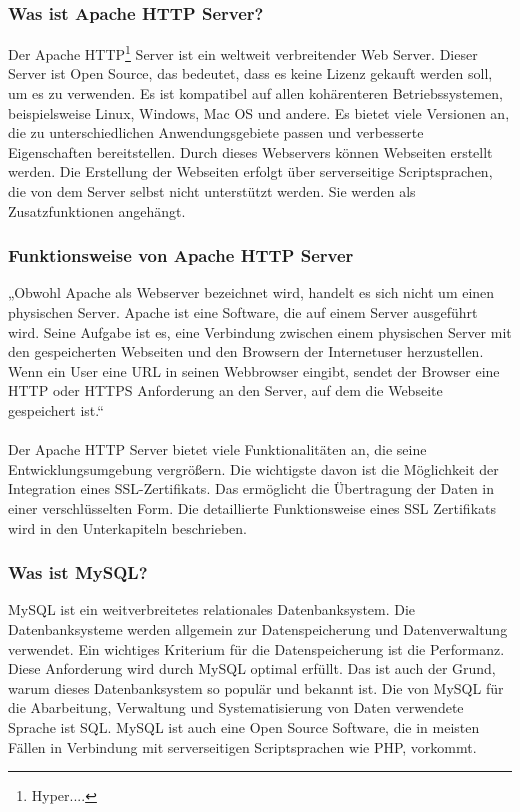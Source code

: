 \subsubsection{Was ist Apache HTTP Server?} 
Der Apache HTTP\footnote{Hyper....} Server ist ein weltweit verbreitender Web Server. Dieser Server ist Open Source, das bedeutet, dass es keine Lizenz gekauft werden soll, um es zu verwenden. Es ist kompatibel auf allen kohärenteren Betriebssystemen, beispielsweise Linux, Windows, Mac OS und andere. Es bietet viele Versionen an, die zu unterschiedlichen Anwendungsgebiete passen und verbesserte Eigenschaften bereitstellen. Durch dieses Webservers können Webseiten erstellt werden. Die Erstellung der Webseiten erfolgt über serverseitige Scriptsprachen, die von dem Server selbst nicht unterstützt werden. Sie werden als Zusatzfunktionen angehängt. 
\subsubsection{Funktionsweise von Apache HTTP Server} 
„Obwohl Apache als Webserver bezeichnet wird, handelt es sich nicht um einen physischen Server. Apache ist eine Software, die auf einem Server ausgeführt wird. Seine Aufgabe ist es, eine Verbindung zwischen einem physischen Server mit den gespeicherten Webseiten und den Browsern der Internetuser herzustellen. \\
Wenn ein User eine URL in seinen Webbrowser eingibt, sendet der Browser eine HTTP oder HTTPS Anforderung an den Server, auf dem die Webseite gespeichert ist.“ \\
\\
Der Apache HTTP Server bietet viele Funktionalitäten an, die seine Entwicklungsumgebung vergrößern. Die wichtigste davon ist die Möglichkeit der Integration eines SSL-Zertifikats. Das ermöglicht die Übertragung der Daten in einer verschlüsselten Form. Die detaillierte Funktionsweise eines SSL Zertifikats wird in den Unterkapiteln beschrieben. 
\subsubsection{Was ist MySQL?} 
MySQL ist ein weitverbreitetes relationales Datenbanksystem. Die Datenbanksysteme werden allgemein zur Datenspeicherung und Datenverwaltung verwendet. Ein wichtiges Kriterium für die Datenspeicherung ist die Performanz. Diese Anforderung wird durch MySQL optimal erfüllt. Das ist auch der Grund, warum dieses Datenbanksystem so populär und bekannt ist. Die von MySQL für die Abarbeitung, Verwaltung und Systematisierung von Daten verwendete Sprache ist SQL. MySQL ist auch eine Open Source Software,
die in meisten Fällen in Verbindung mit serverseitigen Scriptsprachen wie PHP, vorkommt.
